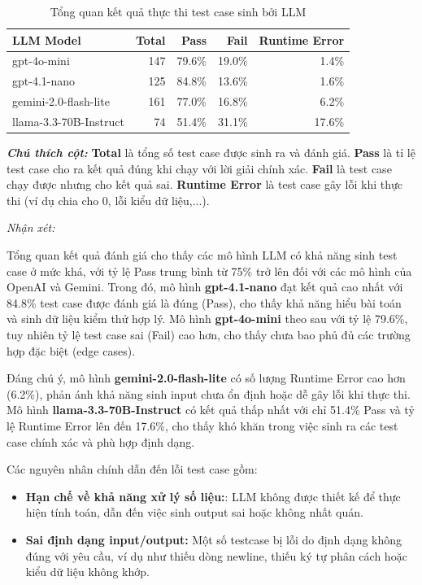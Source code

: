 \begin{table}[H]
\centering
\begin{tabular}{lrrrr}
\toprule
\textbf{LLM Model} & \textbf{Total} & \textbf{Pass} & \textbf{Fail} & \textbf{Runtime Error} \\
\midrule
gpt-4o-mini            & 147 & 79.6\% & 19.0\% & 1.4\%  \\
gpt-4.1-nano           & 125 & 84.8\% & 13.6\% & 1.6\%  \\
gemini-2.0-flash-lite  & 161 & 77.0\% & 16.8\% & 6.2\% \\
llama-3.3-70B-Instruct & 74  & 51.4\% & 31.1\% & 17.6\% \\
\bottomrule
\end{tabular}
\caption{Tổng quan kết quả thực thi test case sinh bởi LLM}
\vspace{0.5em}
\noindent
\textit{\textbf{Chú thích cột:}} 
\textbf{Total} là tổng số test case được sinh ra và đánh giá. 
\textbf{Pass} là tỉ lệ test case cho ra kết quả đúng khi chạy với lời giải chính xác. 
\textbf{Fail} là test case chạy được nhưng cho kết quả sai. 
\textbf{Runtime Error} là test case gây lỗi khi thực thi (ví dụ chia cho 0, lỗi kiểu dữ liệu,...).
\end{table}

\emph{Nhận xét: }

Tổng quan kết quả đánh giá cho thấy các mô hình LLM có khả năng sinh test case ở mức khá, với tỷ lệ Pass trung bình từ 75\% trở lên đối với các mô hình của OpenAI và Gemini. Trong đó, mô hình \textbf{gpt-4.1-nano} đạt kết quả cao nhất với 84.8\% test case được đánh giá là đúng (Pass), cho thấy khả năng hiểu bài toán và sinh dữ liệu kiểm thử hợp lý. Mô hình \textbf{gpt-4o-mini} theo sau với tỷ lệ 79.6\%, tuy nhiên tỷ lệ test case sai (Fail) cao hơn, cho thấy chưa bao phủ đủ các trường hợp đặc biệt (edge cases).

Đáng chú ý, mô hình \textbf{gemini-2.0-flash-lite} có số lượng Runtime Error cao hơn (6.2\%), phản ánh khả năng sinh input chưa ổn định hoặc dễ gây lỗi khi thực thi. Mô hình \textbf{llama-3.3-70B-Instruct} có kết quả thấp nhất với chỉ 51.4\% Pass và tỷ lệ Runtime Error lên đến 17.6\%, cho thấy khó khăn trong việc sinh ra các test case chính xác và phù hợp định dạng.

Các nguyên nhân chính dẫn đến lỗi test case gồm:
\begin{itemize}
    \item \textbf{Hạn chế về khả năng xử lý số liệu:}: LLM không được thiết kế để thực hiện tính toán, dẫn đến việc sinh output sai hoặc không nhất quán.
    \item \textbf{Sai định dạng input/output:} Một số testcase bị lỗi do định dạng không đúng với yêu cầu, ví dụ như thiếu dòng newline, thiếu ký tự phân cách hoặc kiểu dữ liệu không khớp.
\end{itemize}
